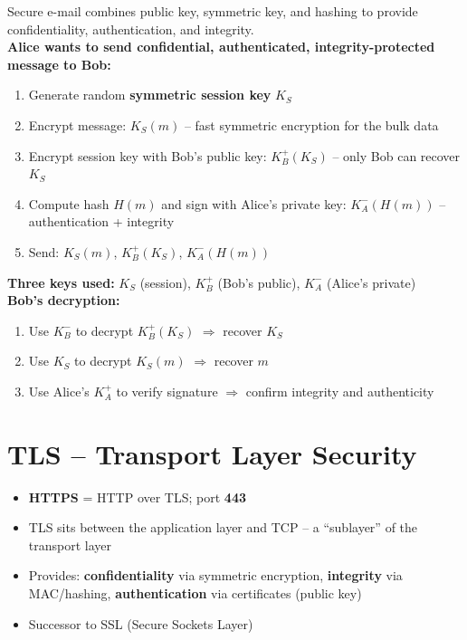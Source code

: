 \begin{tcolorbox}[keybox, title=Secure E-mail -- All Three Goals]
Secure e-mail combines public key, symmetric key, and hashing to provide confidentiality, authentication, and integrity.\\[6pt]
\textbf{Alice wants to send confidential, authenticated, integrity-protected message to Bob:}
\begin{enumerate}[noitemsep]
  \item Generate random \textbf{symmetric session key} $K_S$
  \item Encrypt message: $K_S(m)$ -- fast symmetric encryption for the bulk data
  \item Encrypt session key with Bob's public key: $K_B^+(K_S)$ -- only Bob can recover $K_S$
  \item Compute hash $H(m)$ and sign with Alice's private key: $K_A^-(H(m))$ -- authentication + integrity
  \item Send: $K_S(m)$, $K_B^+(K_S)$, $K_A^-(H(m))$
\end{enumerate}
\textbf{Three keys used:} $K_S$ (session), $K_B^+$ (Bob's public), $K_A^-$ (Alice's private)\\[4pt]
\textbf{Bob's decryption:}
\begin{enumerate}[noitemsep]
  \item Use $K_B^-$ to decrypt $K_B^+(K_S)$ $\Rightarrow$ recover $K_S$
  \item Use $K_S$ to decrypt $K_S(m)$ $\Rightarrow$ recover $m$
  \item Use Alice's $K_A^+$ to verify signature $\Rightarrow$ confirm integrity and authenticity
\end{enumerate}
\end{tcolorbox}

\section{TLS -- Transport Layer Security}

\begin{tcolorbox}[keybox, title=TLS Overview]
\begin{itemize}[noitemsep]
  \item \textbf{HTTPS} = HTTP over TLS; port \textbf{443}
  \item TLS sits between the application layer and TCP -- a ``sublayer'' of the transport layer
  \item Provides: \textbf{confidentiality} via symmetric encryption, \textbf{integrity} via MAC/hashing, \textbf{authentication} via certificates (public key)
  \item Successor to SSL (Secure Sockets Layer)
\end{itemize}
\end{tcolorbox}

